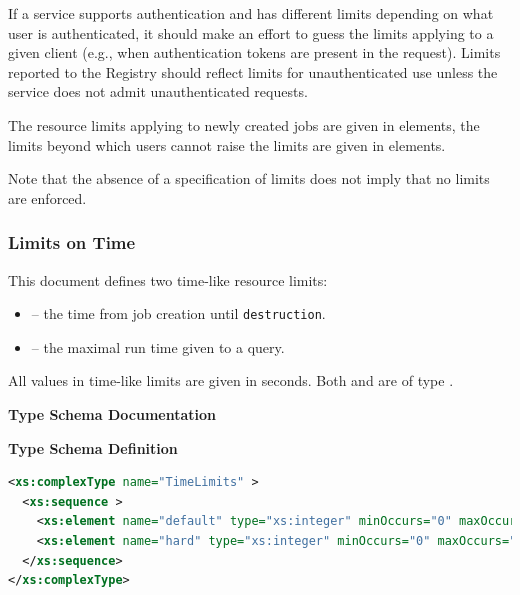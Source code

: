 \documentclass{ivoa}
\begin{document}
If a service supports authentication and has different
limits depending on what user is authenticated, it should make an effort
to guess the limits applying to a given client (e.g., when
authentication tokens are present in the request).  Limits reported to
the Registry should reflect limits for unauthenticated use unless the
service does not admit unauthenticated requests.

The resource limits applying to newly created jobs are given in
 elements, the limits beyond which users cannot
raise the limits are given in  elements.

Note that the absence of a specification of limits does not imply that
no limits are enforced.


\subsubsection{Limits on Time}
This document defines two time-like resource limits:


\begin{itemize}

\item {} -- the time from job creation until
		\texttt{destruction}.{}

\item {} -- the maximal run time given to
		a query.{}

\end{itemize}
All values in time-like limits are given in seconds.  Both 
 and  are of type
.

\begingroup
      	\renewcommand*\descriptionlabel[1]{%
      	\hbox to 5.5em{\emph{#1}\hfil}}
      	\vspace{2ex}\noindent\textbf{ Type Schema Documentation}


\vspace{1ex}\noindent\textbf{ Type Schema Definition}

\begin{lstlisting}[language=XML,basicstyle=\footnotesize]
<xs:complexType name="TimeLimits" >
  <xs:sequence >
    <xs:element name="default" type="xs:integer" minOccurs="0" maxOccurs="1" />
    <xs:element name="hard" type="xs:integer" minOccurs="0" maxOccurs="1" />
  </xs:sequence>
</xs:complexType>
\end{lstlisting}
\end{document}
